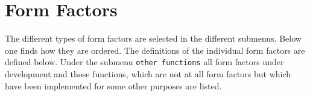 
\chapter{Form Factors}
\label{formfactor}

 The different types of form factors are
selected in the different submenus. Below one finds how they are
ordered. The definitions of the individual form factors are
defined below. Under the submenu \texttt{other functions} all form
factors under development and those functions, which are not at
all form factors but which have been implemented for some other
purposes are listed.
